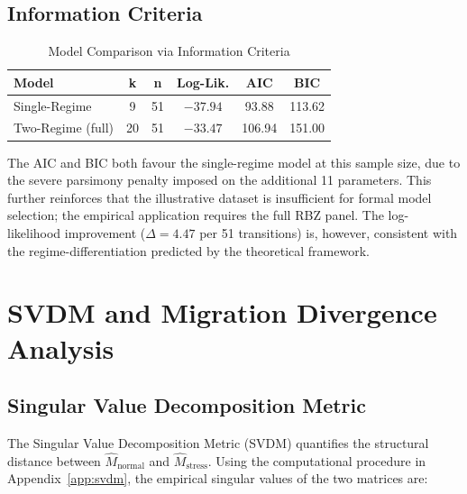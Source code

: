 \documentclass[12pt,a4paper]{article}
\begin{document}
\subsection{Information Criteria}

\begin{table}[H]
\centering
\caption{Model Comparison via Information Criteria}
\label{tab:ic_comparison}
\begin{tabular}{@{}lccccc@{}}
\toprule
\textbf{Model} & \textbf{k} & \textbf{n} & \textbf{Log-Lik.} & \textbf{AIC} & \textbf{BIC} \\
\midrule
Single-Regime & 9 & 51 & $-37.94$ & 93.88 & 113.62 \\
Two-Regime (full) & 20 & 51 & $-33.47$ & 106.94 & 151.00 \\
\bottomrule
\end{tabular}
\end{table}

The AIC and BIC both favour the single-regime model at this sample size, due to the severe parsimony penalty imposed on the additional 11 parameters. This further reinforces that the illustrative dataset is insufficient for formal model selection; the empirical application requires the full RBZ panel. The log-likelihood improvement ($\Delta = 4.47$ per 51 transitions) is, however, consistent with the regime-differentiation predicted by the theoretical framework.

\section{SVDM and Migration Divergence Analysis}

\subsection{Singular Value Decomposition Metric}

The Singular Value Decomposition Metric (SVDM) quantifies the structural distance between $\hat{M}_{\text{normal}}$ and $\hat{M}_{\text{stress}}$. Using the computational procedure in Appendix~\ref{app:svdm}, the empirical singular values of the two matrices are:
\end{document}
